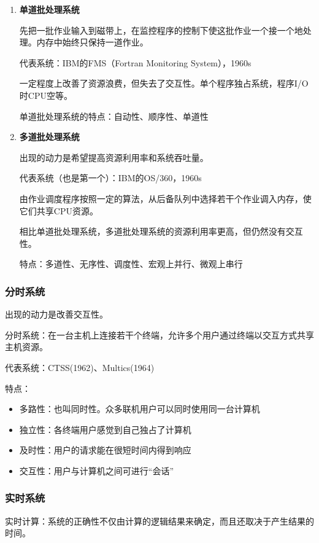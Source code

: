 \documentclass[12pt, a4paper, oneside]{ctexart}
\begin{document}
\begin{enumerate}
  \item {\bf 单道批处理系统}
  
  先把一批作业输入到磁带上，在监控程序的控制下使这批作业一个接一个地处理。内存中始终只保持一道作业。

  代表系统：IBM的FMS（Fortran Monitoring System），1960s

  一定程度上改善了资源浪费，但失去了交互性。单个程序独占系统，程序I/O时CPU空等。

  单道批处理系统的特点：自动性、顺序性、单道性

  \item {\bf 多道批处理系统}
  
  出现的动力是希望提高资源利用率和系统吞吐量。

  代表系统（也是第一个）：IBM的OS/360，1960s

  由作业调度程序按照一定的算法，从后备队列中选择若干个作业调入内存，使它们共享CPU资源。

  相比单道批处理系统，多道批处理系统的资源利用率更高，但仍然没有交互性。

  特点：多道性、无序性、调度性、宏观上并行、微观上串行
\end{enumerate}

\subsubsection{分时系统}

出现的动力是改善交互性。

分时系统：在一台主机上连接若干个终端，允许多个用户通过终端以交互方式共享主机资源。

代表系统：CTSS(1962)、Multics(1964)

特点：
\begin{itemize}
  \item 多路性：也叫同时性。众多联机用户可以同时使用同一台计算机
  \item 独立性：各终端用户感觉到自己独占了计算机
  \item 及时性：用户的请求能在很短时间内得到响应
  \item 交互性：用户与计算机之间可进行“会话”
\end{itemize}

\subsubsection{实时系统}

实时计算：系统的正确性不仅由计算的逻辑结果来确定，而且还取决于产生结果的时间。
\end{document}
